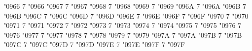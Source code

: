 \Umathcode "0966 7 \symoperators "0966%
\Umathcode "0967 7 \symoperators "0967%
\Umathcode "0968 7 \symoperators "0968%
\Umathcode "0969 7 \symoperators "0969%
\Umathcode "096A 7 \symoperators "096A%
\Umathcode "096B 7 \symoperators "096B%
\Umathcode "096C 7 \symoperators "096C%
\Umathcode "096D 7 \symoperators "096D%
\Umathcode "096E 7 \symoperators "096E%
\Umathcode "096F 7 \symoperators "096F%
%
\Umathcode "0970 7 \symoperators "0970%
\Umathcode "0971 7 \symoperators "0971%
\Umathcode "0972 7 \symoperators "0972%
\Umathcode "0973 7 \symoperators "0973%
\Umathcode "0974 7 \symoperators "0974%
\Umathcode "0975 7 \symoperators "0975%
\Umathcode "0976 7 \symoperators "0976%
\Umathcode "0977 7 \symoperators "0977%
\Umathcode "0978 7 \symoperators "0978%
\Umathcode "0979 7 \symoperators "0979%
\Umathcode "097A 7 \symoperators "097A%
\Umathcode "097B 7 \symoperators "097B%
\Umathcode "097C 7 \symoperators "097C%
\Umathcode "097D 7 \symoperators "097D%
\Umathcode "097E 7 \symoperators "097E%
\Umathcode "097F 7 \symoperators "097F%


